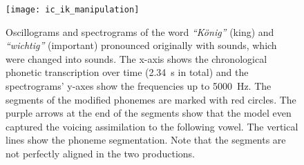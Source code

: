 \begin{landscape}
	\begin{figure}[t]
		\centering
		\vspace*{-2cm}
		\hspace*{-2cm}
		\texttt{[image: ic\_ik\_manipulation]}
		\caption[Oscillograms and spectrograms of categorical manipulation comparison]
			{Oscillograms and spectrograms of the word \emph{\enquote{König}} (king) and \emph{\enquote{wichtig}} (important) pronounced originally with \textipa{[\c{c}]} sounds, which were changed into \textipa{[k]} sounds.
			The x-axis shows the chronological phonetic transcription over time (\SI{2.34}{\second} in total) and the spectrograms' y-axes show the frequencies up to \SI{5000}{\hertz}.
			The segments of the modified phonemes are marked with red circles.
			The purple arrows at the end of the \textipa{[k]} segments show that the model even captured the voicing assimilation to the following vowel.
			The vertical lines show the phoneme segmentation.
			Note that the segments are not perfectly aligned in the two productions.}
		\label{fig:spectrogram_ic_ik}
	\end{figure}
\end{landscape}